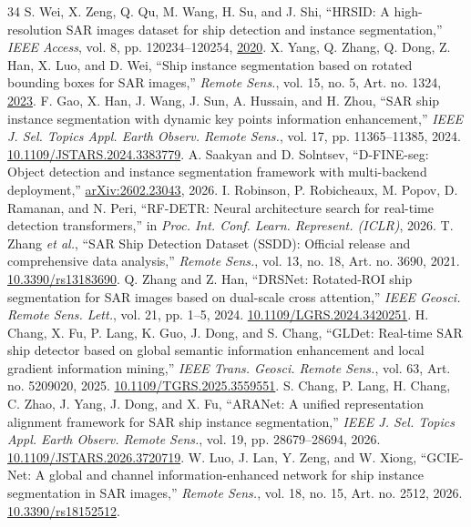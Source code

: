 \documentclass[journal]{IEEEtran}
\begin{document}
\begin{thebibliography}{34}
 S. Wei, X. Zeng, Q. Qu, M. Wang, H. Su, and J. Shi, ``HRSID: A high-resolution SAR images dataset for ship detection and instance segmentation,'' \emph{IEEE Access}, vol. 8, pp. 120234--120254, \href{https://doi.org/10.1109/ACCESS.2020.3005861}{2020}.
 X. Yang, Q. Zhang, Q. Dong, Z. Han, X. Luo, and D. Wei, ``Ship instance segmentation based on rotated bounding boxes for SAR images,'' \emph{Remote Sens.}, vol. 15, no. 5, Art. no. 1324, \href{https://doi.org/10.3390/rs15051324}{2023}.
 F. Gao, X. Han, J. Wang, J. Sun, A. Hussain, and H. Zhou, ``SAR ship instance segmentation with dynamic key points information enhancement,'' \emph{IEEE J. Sel. Topics Appl. Earth Observ. Remote Sens.}, vol. 17, pp. 11365--11385, 2024. \href{https://doi.org/10.1109/JSTARS.2024.3383779}{10.1109/JSTARS.2024.3383779}.
 A. Saakyan and D. Solntsev, ``D-FINE-seg: Object detection and instance segmentation framework with multi-backend deployment,'' \href{https://arxiv.org/abs/2602.23043}{arXiv:2602.23043}, 2026.
 I. Robinson, P. Robicheaux, M. Popov, D. Ramanan, and N. Peri, ``RF-DETR: Neural architecture search for real-time detection transformers,'' in \emph{Proc. Int. Conf. Learn. Represent. (ICLR)}, 2026.
 T. Zhang \emph{et al.}, ``SAR Ship Detection Dataset (SSDD): Official release and comprehensive data analysis,'' \emph{Remote Sens.}, vol. 13, no. 18, Art. no. 3690, 2021. \href{https://doi.org/10.3390/rs13183690}{10.3390/rs13183690}.
 Q. Zhang and Z. Han, ``DRSNet: Rotated-ROI ship segmentation for SAR images based on dual-scale cross attention,'' \emph{IEEE Geosci. Remote Sens. Lett.}, vol. 21, pp. 1--5, 2024. \href{https://doi.org/10.1109/LGRS.2024.3420251}{10.1109/LGRS.2024.3420251}.
 H. Chang, X. Fu, P. Lang, K. Guo, J. Dong, and S. Chang, ``GLDet: Real-time SAR ship detector based on global semantic information enhancement and local gradient information mining,'' \emph{IEEE Trans. Geosci. Remote Sens.}, vol. 63, Art. no. 5209020, 2025. \href{https://doi.org/10.1109/TGRS.2025.3559551}{10.1109/TGRS.2025.3559551}.
 S. Chang, P. Lang, H. Chang, C. Zhao, J. Yang, J. Dong, and X. Fu, ``ARANet: A unified representation alignment framework for SAR ship instance segmentation,'' \emph{IEEE J. Sel. Topics Appl. Earth Observ. Remote Sens.}, vol. 19, pp. 28679--28694, 2026. \href{https://doi.org/10.1109/JSTARS.2026.3720719}{10.1109/JSTARS.2026.3720719}.
 W. Luo, J. Lan, Y. Zeng, and W. Xiong, ``GCIE-Net: A global and channel information-enhanced network for ship instance segmentation in SAR images,'' \emph{Remote Sens.}, vol. 18, no. 15, Art. no. 2512, 2026. \href{https://doi.org/10.3390/rs18152512}{10.3390/rs18152512}.

\end{thebibliography}
\end{document}
